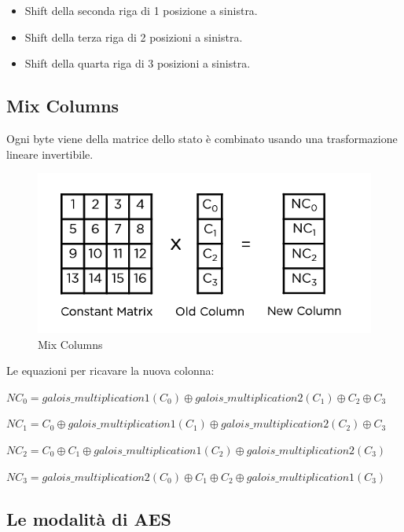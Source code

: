 \begin{itemize}
	\item \textsf{\small Shift della seconda riga di 1 posizione a sinistra.}
	\item \textsf{\small Shift della terza riga di 2 posizioni a sinistra.}
	\item \textsf{\small Shift della quarta riga di 3 posizioni a sinistra.}
\end{itemize}

\subsection{Mix Columns}

 

\textsf{\small Ogni byte viene della matrice dello stato è combinato usando una trasformazione lineare invertibile.}

\begin{figure}[H]
	\centering
	\includegraphics[width=.9\textwidth, height=.9\textheight, keepaspectratio]{./images/aes/mixcolumns.png}
	\caption{Mix Columns}
	\label{fig:mix_columns2}
\end{figure}

\textsf{\small Le equazioni per ricavare la nuova colonna: }

\textsf{\small $ NC_0 = galois\_multiplication 1 (C_0) \oplus galois\_multiplication 2 (C_1) \oplus C_2 \oplus C_3 $}

\textsf{\small $ NC_1 = C_0 \oplus galois\_multiplication 1 (C_1) \oplus galois\_multiplication 2 (C_2) \oplus C_3 $}

\textsf{\small $ NC_2 = C_0 \oplus C_1 \oplus galois\_multiplication 1 (C_2) \oplus galois\_multiplication 2 (C_3) $ }

\textsf{\small $ NC_3 = galois\_multiplication 2 (C_0) \oplus C_1 \oplus C_2 \oplus galois\_multiplication 1 (C_3) $}

\subsection{Le modalità di AES} %

